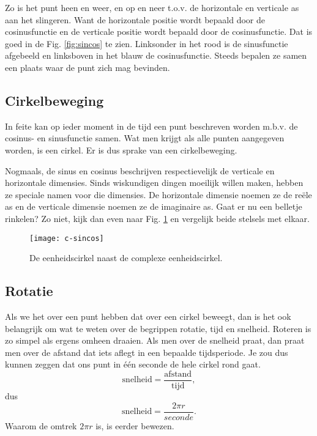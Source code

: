 \documentclass[11pt,fleqn]{book} %
\begin{document}
Zo is het punt heen en weer, en op en neer t.o.v. de horizontale en verticale as aan het slingeren. Want de horizontale positie wordt bepaald door de cosinusfunctie en de verticale positie wordt bepaald door de cosinusfunctie. Dat is goed in de Fig. \ref{fig:sincos} te zien. Linksonder in het rood is de sinusfunctie afgebeeld en linksboven in het blauw de cosinusfunctie. Steeds bepalen ze samen een plaats waar de punt zich mag bevinden.

\subsection{Cirkelbeweging}
In feite kan op ieder moment in de tijd een punt beschreven worden m.b.v. de cosinus- en sinusfunctie samen. Wat men krijgt als alle punten aangegeven worden, is een cirkel. Er is dus sprake van een cirkelbeweging.

Nogmaals, de sinus en cosinus beschrijven respectievelijk de verticale en horizontale dimensies. Sinds wiskundigen dingen moeilijk willen maken, hebben ze speciale namen voor die dimensies. De horizontale dimensie noemen ze de reële as en de verticale dimensie noemen ze de imaginaire as. Gaat er nu een belletje rinkelen? Zo niet, kijk dan even naar Fig. \ref{fig:c-sincos} en vergelijk beide stelsels met elkaar.
\begin{figure}[h]
	\centering\texttt{[image: c-sincos]}
	\caption{De eenheidscirkel naast de complexe eenheidscirkel.}
	\label{fig:c-sincos}
\end{figure}

\subsection{Rotatie}
Als we het over een punt hebben dat over een cirkel beweegt, dan is het ook belangrijk om wat te weten over de begrippen rotatie, tijd en snelheid. Roteren is zo simpel als ergens omheen draaien. Als men over de snelheid praat, dan praat men over de afstand dat iets aflegt in een bepaalde tijdsperiode. Je zou dus kunnen zeggen dat ons punt in één seconde de hele cirkel rond gaat.
\begin{displaymath}
	\text{snelheid}=\frac{\text{afstand}}{\text{tijd}},
\end{displaymath}
dus
\begin{displaymath}
	\text{snelheid}=\frac{2\pi r}{seconde}.
\end{displaymath}
Waarom de omtrek $2\pi r$ is, is eerder bewezen.
\end{document}
